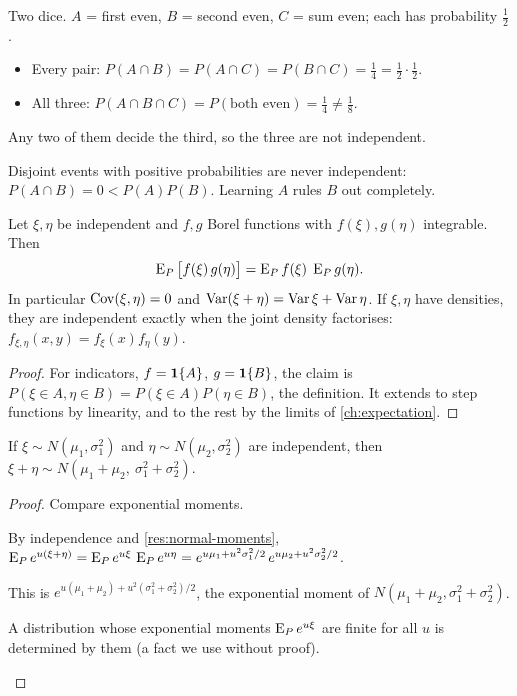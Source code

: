 \begin{example}
Two dice. $A$ = first even, $B$ = second even, $C$ = sum even; each has probability $\frac12$.
\begin{itemize}
  \item Every pair: $P(A\cap B)=P(A\cap C)=P(B\cap C)=\frac14=\frac12\cdot\frac12$.
  \item All three: $P(A\cap B\cap C)=P(\text{both even})=\frac14\ne\frac18$.
\end{itemize}
Any two of them decide the third, so the three are not independent.
\end{example}

Disjoint events with positive probabilities are never independent: $P(A\cap B)=0<P(A)P(B)$. Learning $A$ rules $B$ out completely.

\begin{result}
\label{res:indep-E}
Let $\xi,\eta$ be independent and $f,g$ Borel functions with $f(\xi),g(\eta)$ integrable. Then
\[
  \operatorname{E}_P\big[f(\xi)\,g(\eta)\big]=\operatorname{E}_P f(\xi)\;\operatorname{E}_P g(\eta).
\]
In particular $\operatorname{Cov}(\xi,\eta)=0$ and $\operatorname{Var}(\xi+\eta)=\operatorname{Var}\xi+\operatorname{Var}\eta$. If $\xi,\eta$ have densities, they are independent exactly when the joint density factorises: $f_{\xi,\eta}(x,y)=f_\xi(x)f_\eta(y)$.
\end{result}
\begin{proof}
For indicators, $f=\mathbf{1}\{A\}$, $g=\mathbf{1}\{B\}$, the claim is $P(\xi\in A,\eta\in B)=P(\xi\in A)P(\eta\in B)$, the definition. It extends to step functions by linearity, and to the rest by the limits of \cref{ch:expectation}.
\end{proof}

\begin{result}
\label{res:normal-sum}
If $\xi\sim N(\mu_1,\sigma_1^2)$ and $\eta\sim N(\mu_2,\sigma_2^2)$ are independent, then $\xi+\eta\sim N(\mu_1+\mu_2,\ \sigma_1^2+\sigma_2^2)$.
\end{result}
\begin{proof}
Compare exponential moments.
\begin{steps}
  \item By independence and \cref{res:normal-moments}, $\operatorname{E}_Pe^{u(\xi+\eta)}=\operatorname{E}_Pe^{u\xi}\,\operatorname{E}_Pe^{u\eta}=e^{u\mu_1+u^2\sigma_1^2/2}\,e^{u\mu_2+u^2\sigma_2^2/2}$.
  \item This is $e^{u(\mu_1+\mu_2)+u^2(\sigma_1^2+\sigma_2^2)/2}$, the exponential moment of $N(\mu_1+\mu_2,\sigma_1^2+\sigma_2^2)$.
  \item A distribution whose exponential moments $\operatorname{E}_Pe^{u\xi}$ are finite for all $u$ is determined by them (a fact we use without proof). \qedhere
\end{steps}
\end{proof}

